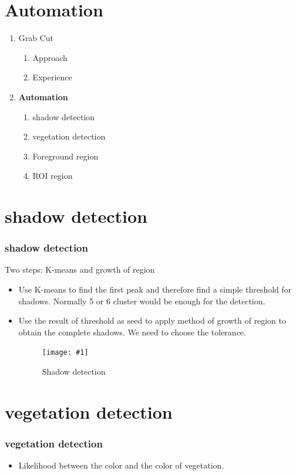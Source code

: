 \documentclass[compress]{beamer} %
\newcommand{\insertF}[3]{
  \begin{figure}[h!]
    \centering
    \begin{minipage}{#3\linewidth}
    \texttt{[image: \#1]}
    \end{minipage}  
      \caption{#2}
  \end{figure}  
}
\begin{document}
\section{Automation}
 \begin{frame}
  \scriptsize
  {
  \begin{enumerate}
  \item {Grab Cut} 
    \begin{enumerate}
     \item Approach
     \item Experience
    \end{enumerate}
  \item \textbf{Automation}
    \begin{enumerate}
     \item shadow detection
     \item vegetation detection
     \item Foreground region
     \item ROI region
    \end{enumerate}
  \end{enumerate}
  }
 \end{frame}   
 
\section{shadow detection}
\begin{frame}
  \frametitle{shadow detection}
   Two steps: K-means and growth of region 
  \begin{itemize}
   \item Use K-means to find the first peak and therefore find a simple threshold for shadows. Normally 5 or 6 cluster would be enough for the detection. 
  
   \item Use the result of threshold as seed to apply method of growth of region to obtain the complete shadows. We need to choose the tolerance.
    \insertF{shadow}{Shadow detection}{0.4}
  \end{itemize}
 \end{frame} 
 
 \section{vegetation detection}
\begin{frame}
  \frametitle{vegetation detection}
  \begin{itemize}
   \item Likelihood between the color and the color of vegetation.
   \end{itemize}
 \end{frame} 
 
\end{document}
